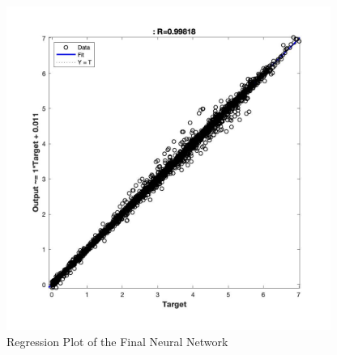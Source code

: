\documentclass{article}
\begin{document}
\begin{figure}[!h]
\center
  \includegraphics[width=300pt]{img/regression.jpg}
  \caption{Regression Plot of the Final Neural Network}
  \label{fig:regression}
\end{figure}

\newpage
\end{document}
